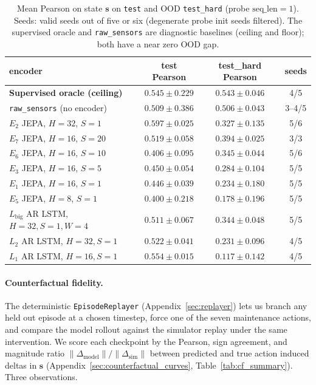 \documentclass{article}
\begin{document}
\begin{table}[h]
\centering
\small
\setlength{\tabcolsep}{5pt}
\caption{Mean Pearson on state $\mathbf{s}$ on \texttt{test} and OOD \texttt{test\_hard}
(probe $\mathrm{seq\_len}{=}1$). Seeds: valid seeds out of five or
six (degenerate probe init seeds filtered). The supervised oracle and
\texttt{raw\_sensors} are diagnostic baselines (ceiling and floor);
both have a near zero OOD gap.}
\label{tab:s4_main}
\begin{tabular}{l c c c}
\toprule
encoder & test Pearson & test\_hard Pearson & seeds \\
\midrule
\textbf{Supervised oracle (ceiling)} & $0.545 \pm 0.229$ & $\mathbf{0.543 \pm 0.046}$ & 4/5 \\
\texttt{raw\_sensors} (no encoder)   & $0.509 \pm 0.386$ & $0.506 \pm 0.043$         & 3--4/5 \\
\midrule
$E_2$ JEPA, $H{=}32$, $S{=}1$        & $\mathbf{0.597 \pm 0.025}$ & $0.327 \pm 0.135$ & 5/6 \\
$E_7$ JEPA, $H{=}16$, $S{=}20$       & $0.519 \pm 0.058$ & $0.394 \pm 0.025$         & 3/3 \\
$E_6$ JEPA, $H{=}16$, $S{=}10$       & $0.406 \pm 0.095$ & $0.345 \pm 0.044$         & 5/6 \\
$E_3$ JEPA, $H{=}16$, $S{=}5$        & $0.450 \pm 0.054$ & $0.284 \pm 0.104$         & 5/5 \\
$E_1$ JEPA, $H{=}16$, $S{=}1$        & $0.446 \pm 0.039$ & $0.234 \pm 0.180$         & 5/5 \\
$E_5$ JEPA, $H{=}8$,  $S{=}1$        & $0.400 \pm 0.218$ & $0.178 \pm 0.196$         & 5/5 \\
$L_\mathrm{big}$ AR LSTM, $H{=}32, S{=}1, W{=}4$ & $0.511 \pm 0.067$ & $0.344 \pm 0.048$ & 5/5 \\
$L_2$ AR LSTM, $H{=}32, S{=}1$       & $0.522 \pm 0.041$ & $0.231 \pm 0.096$         & 4/5 \\
$L_1$ AR LSTM, $H{=}16, S{=}1$       & $0.554 \pm 0.015$ & $0.117 \pm 0.142$         & 4/5 \\
\bottomrule
\end{tabular}
\end{table}

\paragraph{Counterfactual fidelity.}
The deterministic \texttt{EpisodeReplayer}
(Appendix~\ref{sec:replayer}) lets us branch any held out episode at a
chosen timestep, force one of the seven maintenance actions, and
compare the model rollout against the simulator replay under the same
intervention. We score each checkpoint by the Pearson,
sign agreement, and magnitude ratio
$\lVert\Delta_\mathrm{model}\rVert / \lVert\Delta_\mathrm{sim}\rVert$
between predicted and true action induced deltas in $\mathbf{s}$
(Appendix~\ref{sec:counterfactual_curves}, Table~\ref{tab:cf_summary}).
Three observations.
\end{document}
